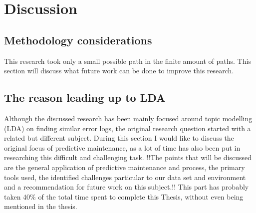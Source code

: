 \begin{comment}
Making use of the models has shown to cluster new data very well using distance measures like jensen shannon divergence. E We recommend using more simpler techniques on data based on logs. 

We had skewed data from the start, which makes unsupervised clustering with LDA actually less usefull. LDA has more power when used with more full documents, the short nature like tweets doesnt help the. We can't conclude even thought our models performed reasonably based on our own visual evaluation that LDA might be reliable for future use. We propose the usages with LDA with care when applying on small tekst in domain specific use like server logs. The variability of the server logs and our unlabeled nature makes it even harder for applying unsupervised clustering. Althought the premise was interesting. Much improvements can be made in each step based. We recommend a more streamlined pipeline for future use. 
\end{comment}

\section{Discussion}

\subsection {Methodology considerations}
This research took only a small possible path in the finite amount of paths. This section will discuss what future work can be done to improve this research.

\subsection{The reason leading up to LDA}\label{conclusion:discussion}
Although the discussed research has been mainly focused around topic modelling (LDA) on finding similar error logs, the original research question started with a related but different subject. During this section I would like to discuss the original focus of predictive maintenance, as a lot of time has also been put in researching this difficult and challenging task. !!The points that will be discussed are the general application of predictive maintenance and process, the primary tools used, the identified challenges particular to our data set and environment and a recommendation for future work on this subject.!! This part has probably taken 40\% of the total time spent to complete this Thesis, without even being mentioned in the thesis.

